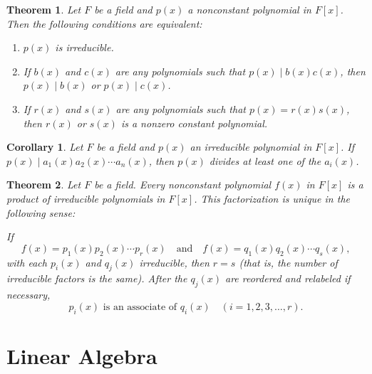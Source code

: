 \documentclass{article}
\newtheorem{theorem}{Theorem}[section]
\newtheorem{corollary}{Corollary}[section]
\theoremstyle{definition}
\theoremstyle{remark}
\begin{document}
\begin{theorem} \label{thm:irreducibility conditions}
Let $F$ be a field and $p(x)$ a nonconstant polynomial in $F[x]$. Then the following conditions are equivalent:
\begin{enumerate}
\item $p(x)$ is irreducible.
\item If $b(x)$ and $c(x)$ are any polynomials such that $p(x) \mid b(x)c(x)$, then $p(x) \mid b(x)$ or $p(x) \mid c(x)$.
\item If $r(x)$ and $s(x)$ are any polynomials such that $p(x) = r(x)s(x)$, then $r(x)$ or $s(x)$ is a nonzero constant polynomial.
\end{enumerate}
\end{theorem}







\begin{corollary} \label{cor:irreducible polynomial divisibility}
Let $F$ be a field and $p(x)$ an irreducible polynomial in $F[x]$. If $p(x) \mid a_1(x) a_2(x) \cdots a_n(x)$, then $p(x)$ divides at least one of the $a_i(x)$.
\end{corollary}


\begin{theorem} \label{thm:unique factorization}
Let $F$ be a field. Every nonconstant polynomial $f(x)$ in $F[x]$ is a product of irreducible polynomials in $F[x]$. This factorization is unique in the following sense:

If
\[
f(x) = p_1(x) p_2(x) \cdots p_r(x) \quad \text{and} \quad f(x) = q_1(x) q_2(x) \cdots q_s(x),
\]
with each $p_i(x)$ and $q_j(x)$ irreducible, then $r = s$ (that is, the number of irreducible factors is the same). After the $q_j(x)$ are reordered and relabeled if necessary,
\[
p_i(x) \text{ is an associate of } q_i(x) \quad (i = 1, 2, 3, \dots, r).
\]
\end{theorem}






\section{Linear Algebra}
\end{document}
